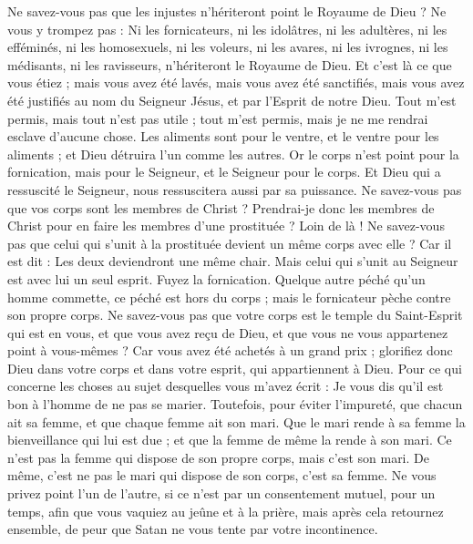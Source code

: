 \begin{multicols}{2}
Ne savez-vous pas que les injustes n'hériteront point le Royaume de Dieu ? Ne vous y trompez pas : Ni les fornicateurs, ni les idolâtres, ni les adultères,
ni les efféminés, ni les homosexuels, ni les voleurs, ni les avares, ni les ivrognes, ni les médisants, ni les ravisseurs, n'hériteront le Royaume de Dieu.
Et c’est là ce que vous étiez ; mais vous avez été lavés, mais vous avez été sanctifiés, mais vous avez été justifiés au nom du Seigneur Jésus, et par l'Esprit de notre Dieu.
Tout m’est permis, mais tout n’est pas utile ; tout m’est permis, mais je ne me rendrai esclave d’aucune chose.
Les aliments sont pour le ventre, et le ventre pour les aliments ; et Dieu détruira l'un comme les autres. Or le corps n'est point pour la fornication, mais pour le Seigneur, et le Seigneur pour le corps.
Et Dieu qui a ressuscité le Seigneur, nous ressuscitera aussi par sa puissance.
Ne savez-vous pas que vos corps sont les membres de Christ ? Prendrai-je donc les membres de Christ pour en faire les membres d'une prostituée ? Loin de là !
Ne savez-vous pas que celui qui s'unit à la prostituée devient un même corps avec elle ? Car il est dit : Les deux deviendront une même chair.
Mais celui qui s’unit au Seigneur est avec lui un seul esprit.
Fuyez la fornication. Quelque autre péché qu’un homme commette, ce péché est hors du corps ; mais le fornicateur pèche contre son propre corps.
Ne savez-vous pas que votre corps est le temple du Saint-Esprit qui est en vous, et que vous avez reçu de Dieu, et que vous ne vous appartenez point à vous-mêmes ?
Car vous avez été achetés à un grand prix ; glorifiez donc Dieu dans votre corps et dans votre esprit, qui appartiennent à Dieu.
\VerseOne{}Pour ce qui concerne les choses au sujet desquelles vous m'avez écrit : Je vous dis qu'il est bon à l'homme de ne pas se marier.
Toutefois, pour éviter l'impureté, que chacun ait sa femme, et que chaque femme ait son mari.
Que le mari rende à sa femme la bienveillance qui lui est due ; et que la femme de même la rende à son mari.
Ce n’est pas la femme qui dispose de son propre corps, mais c’est son mari. De même, c’est ne pas le mari qui dispose de son corps, c’est sa femme.
Ne vous privez point l'un de l'autre, si ce n'est par un consentement mutuel, pour un temps, afin que vous vaquiez au jeûne et à la prière, mais après cela retournez ensemble, de peur que Satan ne vous tente par votre incontinence.

\end{multicols}
